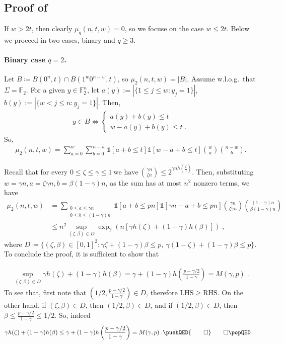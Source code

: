 \documentclass{article}
\theoremstyle{plain}
\theoremstyle{plain}
\theoremstyle{plain}
\theoremstyle{plain}
\theoremstyle{plain}
\theoremstyle{plain}
\theoremstyle{plain}
\theoremstyle{plain}
\theoremstyle{plain}
\theoremstyle{plain}
\theoremstyle{remark}
\theoremstyle{remark}
\theoremstyle{remark}
\theoremstyle{plain}
\begin{document}
\subsection{Proof of }

If $w>2t$, then clearly $\mu_q(n,t,w)=0$,
so we focuse on the case $w\le 2t$.
Below we proceed in two cases,
binary and $q\ge 3$.

\paragraph{Binary case $q=2$.}
   Let $B\coloneqq
   B(0^n,t)\cap B(1^w0^{n-w},t)$, so $\mu_2(n,t,w)=|B|$. Assume w.l.o.g.~that
   $\Sigma=\mathbb{F}_2$.
   For a given $y\in\mathbb{F}_2^n$, let $a(y):=|\{1\le j\le w: y_j=1\}|$, $b(y):=|\{w<j\le n: y_j=1\}|$. Then,
   \begin{align*}
       y\in B \iff \begin{cases}a(y)+b(y)\le t \\ w-a(y)+b(y)\le t\;.\end{cases}
   \end{align*}
   So, 
   \begin{align*}    \mu_2(n,t,w)=\sum_{a=0}^{w}\sum_{b=0}^{n-w} \mathds{1}[a+b\le t]\mathds{1}[w-a+b\le t]\binom{w}{a} \binom{n - w}{b}.
   \end{align*}
   
   Recall that for every $0\le\zeta\le \gamma\le1\ \text{we have}\ \binom{\gamma n}{\zeta n} \le2^{\gamma n h(\frac{\zeta}{\gamma})}$. Then, substituting $w=\gamma n, a=\zeta \gamma n, b=\beta(1-\gamma) n$, 
   as the sum has at most $n^2$ nonzero terms, we have 
   \begin{align*}
       \mu_2(n,t,w)&=\underset{\substack{0\le a\le \gamma n\\0\le b\le (1-\gamma) n}}{\sum} 
       \mathds{1}[a+b\le pn]\mathds{1}[\gamma n-a+b\le pn]
       \binom{\gamma n}{\zeta \gamma n} \binom{(1-\gamma)n}{\beta(1-\gamma) n}
       \\&\le n^2
       \sup_{(\zeta,\beta)\in D} \exp_2\left(n[\gamma h(\zeta)+(1-\gamma)h(\beta)]\right)\;,
   \end{align*}
where $D\coloneqq\Big\{(\zeta,\beta)\in [0,1]^2:\gamma\zeta + (1-\gamma)\beta\le p,\ \gamma(1-\zeta) + (1-\gamma)\beta\le p\Big\}$. To conclude the proof,
it is sufficient to show that

\begin{align*}
\sup_{(\zeta,\beta)\in D}
\gamma h(\zeta)+(1-\gamma)h(\beta)
=\gamma+(1-\gamma)h\left(
\frac{p-\gamma/2}{1-\gamma}
\right)
=M(\gamma,p)\;.
\end{align*}
To see that, first note
that 
$\left(1/2,\frac{p-\gamma/2}{1-\gamma}\right)\in D$,
therefore $\mathrm{LHS}\ge\mathrm{RHS}$.
On the other hand, if $(\zeta,\beta)\in D$,
then $(1/2,\beta)\in D$, and if
$(1/2,\beta)\in D$, then
$\beta\le\frac{p-\gamma/2}{1-\gamma}
\le 1/2$. So, indeed
\begin{align*}
\gamma h(\zeta)
+(1-\gamma)h(\beta)
&\le \gamma+(1-\gamma)h\left(\frac{p-\gamma/2}{1-\gamma}\right)=M(\gamma,p)\;.
\pushQED{\qed}\qedhere\popQED
\end{align*}
\end{document}
